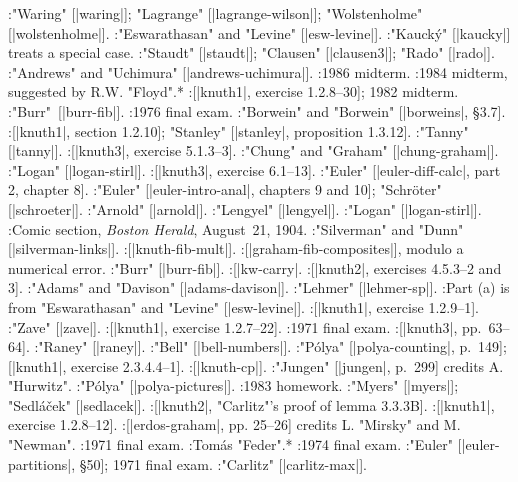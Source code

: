 :"Waring" [|waring|]; "Lagrange" [|lagrange-wilson|]; "Wolstenholme" [|wolstenholme|].
:"Eswarathasan" and "Levine" [|esw-levine|].
:"Kauck\'y" [|kaucky|] treats a special case.
:"Staudt" [|staudt|]; "Clausen" [|clausen3|]; "Rado" [|rado|].
:"Andrews" and "Uchimura" [|andrews-uchimura|].
:1986 midterm.
:1984 midterm, suggested by R.\thinspace W. "Floyd".*
:[|knuth1|, exercise 1.2.8--30]; 1982 midterm.\kern -3.5pt
:"Burr"~[|burr-fib|].
:1976 final exam.
:"Borwein" and "Borwein" [|borweins|, \S 3.7].
:[|knuth1|, section 1.2.10]; "Stanley" [|stanley|, proposition 1.3.12].
:"Tanny" [|tanny|].
:[|knuth3|, exercise 5.1.3--3].
:"Chung" and "Graham" [|chung-graham|].
:"Logan" [|logan-stirl|].
:[|knuth3|, exercise 6.1--13].
:"Euler" [|euler-diff-calc|, part 2, chapter 8].
:"Euler" [|euler-intro-anal|, chapters 9 and 10]; "Schr\"oter" [|schroeter|].
:"Arnold" [|arnold|].
:"Lengyel" [|lengyel|].
:"Logan" [|logan-stirl|].
:Comic section, {\sl Boston Herald}, August~21, 1904.
:"Silverman" and "Dunn" [|silverman-links|].
:[|knuth-fib-mult|].
:[|graham-fib-composites|], modulo a numerical error.
:"Burr" [|burr-fib|].
:[|kw-carry|.
:[|knuth2|, exercises 4.5.3--2 and 3].
:"Adams" and "Davison" [|adams-davison|].
:"Lehmer" [|lehmer-sp|].
:Part (a) is from "Eswarathasan" and "Levine" [|esw-levine|].
:[|knuth1|, exercise 1.2.9--1].
:"Zave" [|zave|].
:[|knuth1|, exercise 1.2.7--22].
:1971 final exam.
:[|knuth3|, pp.~63--64].
:"Raney" [|raney|].
:"Bell" [|bell-numbers|].
:"P\'olya" [|polya-counting|, p.~149]; [|knuth1|, exercise 2.3.4.4--1].
:[|knuth-cp|].
:"Jungen" [|jungen|, p.~299] credits A. "Hurwitz".
:"P\'olya" [|polya-pictures|].
:1983 homework.
:"Myers" [|myers|]; "Sedl\'a\v cek" [|sedlacek|].
:[|knuth2|, "Carlitz"'s proof of lemma 3.3.3B].
:[|knuth1|, exercise 1.2.8--12].
:[|erdos-graham|, pp. 25--26] credits L. "Mirsky" and M. "Newman".
:1971 final exam.
:Tom\'as "Feder".*
:1974 final exam.
:"Euler" [|euler-partitions|, \S 50]; 1971 final exam.
:"Carlitz" [|carlitz-max|].
